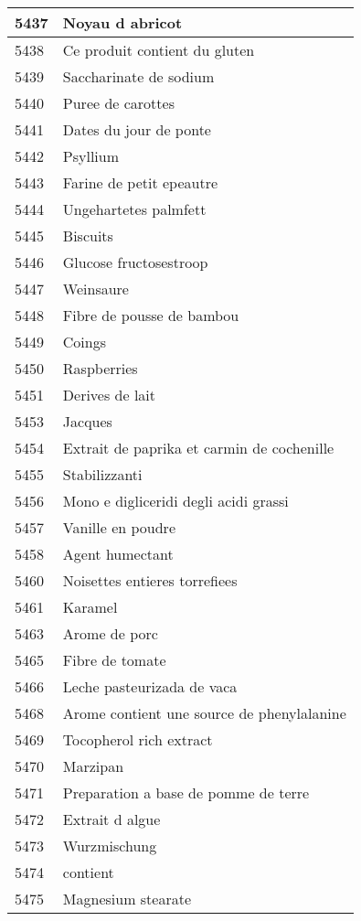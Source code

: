 \begin{longtable}{|l|l|}
5437 & Noyau d abricot \\ \hline 
5438 & Ce produit contient du gluten \\ \hline 
5439 & Saccharinate de sodium \\ \hline 
5440 & Puree de carottes \\ \hline 
5441 & Dates du jour de ponte \\ \hline 
5442 & Psyllium \\ \hline 
5443 & Farine de petit epeautre \\ \hline 
5444 & Ungehartetes palmfett \\ \hline 
5445 & Biscuits \\ \hline 
5446 & Glucose fructosestroop \\ \hline 
5447 & Weinsaure \\ \hline 
5448 & Fibre de pousse de bambou \\ \hline 
5449 & Coings \\ \hline 
5450 & Raspberries \\ \hline 
5451 & Derives de lait \\ \hline 
5453 & Jacques \\ \hline 
5454 & Extrait de paprika et carmin de cochenille \\ \hline 
5455 & Stabilizzanti \\ \hline 
5456 & Mono e digliceridi degli acidi grassi \\ \hline 
5457 & Vanille en poudre \\ \hline 
5458 & Agent humectant \\ \hline 
5460 & Noisettes entieres torrefiees \\ \hline 
5461 & Karamel \\ \hline 
5463 & Arome de porc \\ \hline 
5465 & Fibre de tomate \\ \hline 
5466 & Leche pasteurizada de vaca \\ \hline 
5468 & Arome contient une source de phenylalanine \\ \hline 
5469 & Tocopherol rich extract \\ \hline 
5470 & Marzipan \\ \hline 
5471 & Preparation a base de pomme de terre \\ \hline 
5472 & Extrait d algue \\ \hline 
5473 & Wurzmischung \\ \hline 
5474 & contient \\ \hline 
5475 & Magnesium stearate \\ \hline 

\end{longtable}
